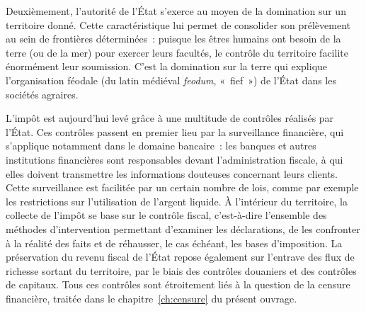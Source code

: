 Deuxièmement, l'autorité de l'État s'exerce au moyen de la domination sur un territoire donné. Cette caractéristique lui permet de consolider son prélèvement au sein de frontières déterminées~: puisque les êtres humains ont besoin de la terre (ou de la mer) pour exercer leurs facultés, le contrôle du territoire facilite énormément leur soumission. C'est la domination sur la terre qui explique l'organisation féodale (du latin médiéval \emph{feodum}, «~fief~») de l'État dans les sociétés agraires. %

L'impôt est aujourd'hui levé grâce à une multitude de contrôles réalisés par l'État. Ces contrôles passent en premier lieu par la surveillance financière, qui s'applique notamment dans le domaine bancaire~: les banques et autres institutions financières sont responsables devant l'administration fiscale, à qui elles doivent transmettre les informations douteuses concernant leurs clients. Cette surveillance est facilitée par un certain nombre de lois, comme par exemple les restrictions sur l'utilisation de l'argent liquide. À l'intérieur du territoire, la collecte de l'impôt se base sur le contrôle fiscal, c'est-à-dire l'ensemble des méthodes d'intervention permettant d'examiner les déclarations, de les confronter à la réalité des faits et de réhausser, le cas échéant, les bases d'imposition. La préservation du revenu fiscal de l'État repose également sur l'entrave des flux de richesse sortant du territoire, par le biais des contrôles douaniers et des contrôles de capitaux. Tous ces contrôles sont étroitement liés à la question de la censure financière, traitée dans le chapitre~\ref{ch:censure} du présent ouvrage. %

